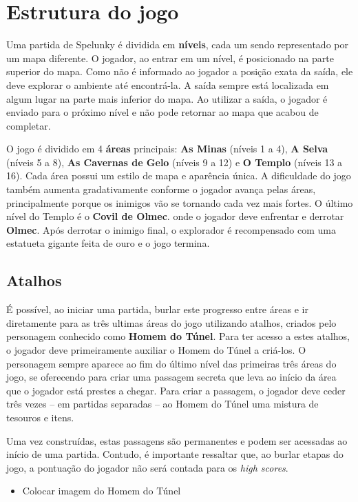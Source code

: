 \section{\label{section:spelunky-structure}Estrutura do jogo}
Uma partida de Spelunky é dividida em \textbf{níveis}, cada um sendo
representado por um mapa diferente. O jogador, ao entrar em um nível, é
posicionado na parte superior do mapa. Como não é informado ao jogador a posição
exata da saída, ele deve explorar o ambiente até encontrá-la. A saída sempre
está localizada em algum lugar na parte mais inferior do mapa. Ao utilizar a
saída, o jogador é enviado para o próximo nível e não pode retornar ao mapa que
acabou de completar.

O jogo é dividido em 4 \textbf{áreas} principais: \textbf{As Minas} (níveis 1 a
4), \textbf{A Selva} (níveis 5 a 8), \textbf{As Cavernas de Gelo} (níveis 9 a
12) e \textbf{O Templo} (níveis 13 a 16). Cada área possui um estilo de mapa e
aparência única. A dificuldade do jogo também aumenta gradativamente conforme o
jogador avança pelas áreas, principalmente porque os inimigos vão se tornando
cada vez mais fortes. O último nível do Templo é o \textbf{Covil de Olmec}. onde
o jogador deve enfrentar e derrotar \textbf{Olmec}. Após derrotar o inimigo
final, o explorador é recompensado com uma estatueta gigante feita de ouro e o
jogo termina.


\subsection{Atalhos}
É possível, ao iniciar uma partida, burlar este progresso entre áreas e ir
diretamente para as três ultimas áreas do jogo utilizando atalhos, criados pelo
personagem conhecido como \textbf{Homem do Túnel}. Para ter acesso a estes
atalhos, o jogador deve primeiramente auxiliar o Homem do Túnel a criá-los. O
personagem sempre aparece ao fim do último nível das primeiras três áreas do
jogo, se oferecendo para criar uma passagem secreta que leva ao início da área
que o jogador está prestes a chegar. Para criar a passagem, o jogador deve ceder
três vezes -- em partidas separadas -- ao Homem do Túnel uma mistura de tesouros
e itens.

Uma vez construídas, estas passagens são permanentes e podem ser acessadas ao
início de uma partida. Contudo, é importante ressaltar que, ao burlar etapas do
jogo, a pontuação do jogador não será contada para os \textit{high scores}.

\begin{mdframed}[backgroundcolor=green!20]
\begin{itemize}
    \item
		Colocar imagem do Homem do Túnel
\end{itemize}
\end{mdframed}


